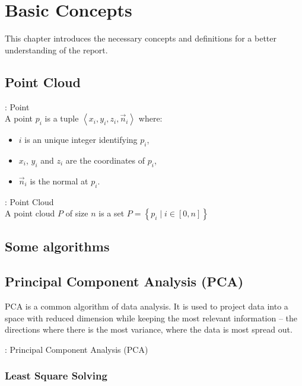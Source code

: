 \chapter{Basic Concepts}
\label{ch:background}
This chapter introduces the necessary concepts and definitions for a better understanding of the report.

\section{Point Cloud}
\begin{definition}{: Point}
  \\A point $p_i$ is a tuple $\left\langle x_i, y_i, z_i, \vec{n}_i \right\rangle$ where:
  \begin{itemize}
    \item $i$ is an unique integer identifying $p_i$,
    \item $x_i$, $y_i$ and $z_i$ are the coordinates of $p_i$,
    \item $\vec{n}_i$ is the normal at $p_i$.
  \end{itemize}
\end{definition}

\begin{definition}{: Point Cloud}
  \\A point cloud $P$ of size $n$ is a set $P = \left\lbrace p_i \mid i \in [0, n]  \right\rbrace$
\end{definition}


\section{Some algorithms}

\section{Principal Component Analysis (PCA)}

PCA is a common algorithm of data analysis. It is used to project data into a space with reduced dimension while keeping the most relevant information -- the directions where there is the most variance, where the data is most spread out.


\begin{definition}{: Principal Component Analysis (PCA)}
\end{definition}


\subsection{Least Square Solving}
